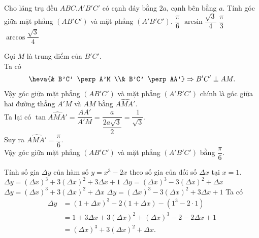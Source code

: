 \begin{ex}%
 Cho lăng trụ đều $ABC.A'B'C'$ có cạnh đáy bằng $2a$, cạnh bên bằng $a$. Tính góc giữa mặt phẳng $(AB'C')$ và mặt phẳng $(A'B'C')$.
 \choice
  {\True $\dfrac{\pi}{6}$}
  {$\arcsin \dfrac{\sqrt{3}}{4}$}
  {$\dfrac{\pi}{3}$}
  {$\arccos \dfrac{\sqrt{3}}{4}$}
 \loigiai
  {
  \immini
  {
  Gọi $M$ là trung điểm của $B'C'$.\\
  Ta có
  \begin{align*}
   \heva{& B'C' \perp A'M \\& B'C' \perp AA'} \Rightarrow B'C' \perp AM.
  \end{align*}
  Vậy góc giữa mặt phẳng $(AB'C')$ và mặt phẳng $(A'B'C')$ chính là góc giữa hai đường thẳng $A'M$ và $AM$ bằng $\widehat{AMA'}$.\\
  Ta lại có $\tan \widehat{AMA'} = \dfrac{AA'}{A'M} = \dfrac{a}{\dfrac{2a \sqrt{3}}{2}} = \dfrac{1}{\sqrt{3}}$.\\
  Suy ra $\widehat{AMA'} = \dfrac{\pi}{6}$.\\
  Vậy góc giữa mặt phẳng $(AB'C')$ và mặt phẳng $(A'B'C')$ bằng $\dfrac{\pi}{6}$.
  }
  {
  }
  }
\end{ex}

\begin{ex}%
 Tính số gia $\Delta y$ của hàm số $y = x^3 - 2x$ theo số gia của đối số $\Delta x$ tại $x = 1$.
 \choice
  {$\Delta y = (\Delta x)^3 + 3 (\Delta x)^2 + 3 \Delta x + 1$}
  {$\Delta y = (\Delta x)^3 - 3 (\Delta x)^2 + \Delta x$}
  {\True $\Delta y = (\Delta x)^3 + 3 (\Delta x)^2 + \Delta x$}
  {$\Delta y = (\Delta x)^3 - 3 (\Delta x)^2 + 3 \Delta x + 1$}
 \loigiai
  {
  Ta có
  \begin{align*}
   \Delta y & = \left(1 + \Delta x \right)^3 - 2(1 + \Delta x) - (1^3 - 2 \cdot 1) \\
            & = 1 + 3 \Delta x + 3 (\Delta x)^2 + (\Delta x)^3 - 2 - 2\Delta x + 1 \\
            & = (\Delta x)^3 + 3 (\Delta x)^2 + \Delta x.
  \end{align*}
  }
\end{ex}

